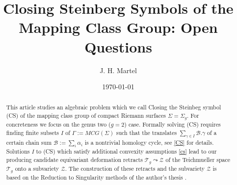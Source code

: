 \documentclass[12pt]{amsart}
\theoremstyle{definition}
\theoremstyle{remark}
\newcommand{\sB}{\mathscr{B}}
\newcommand{\sT}{\mathscr{T}}
\newcommand{\sZ}{\mathscr{Z}}
\begin{document}
\title{Closing Steinberg Symbols of the Mapping Class Group: Open Questions}
\author{J. H. Martel}
\date{\today}
\maketitle

\begin{abstract}
This article studies an algebraic problem which we call Closing the Steinbeg symbol (CS) of the mapping class group of compact Riemann surfaces $\Sigma = \Sigma_g$. For concreteness we focus on the genus two ($g=2$) case. Formally solving (CS) requires finding finite subsets $I$ of $\Gamma:=MCG(\Sigma)$ such that the translates $\sum_{\gamma \in I}\sB.\gamma$ of a certain chain sum $\sB:=\sum_i \alpha_i$ is a nontrivial homology cycle, see \ref{CS} for details. Solutions $I$ to (CS) which satisfy additional convexity assumptions \eqref{cs} lead to our producing candidate equivariant deformation retracts $\sT_g \leadsto \sZ$ of the Teichmueller space $\sT_g$ onto a subvariety $\sZ$. The construction of these retracts and the subvariety $\sZ$ is based on the Reduction to Singularity methods of the author's thesis \cite{martel}. 
\end{abstract}


\tableofcontents





\end{document}
